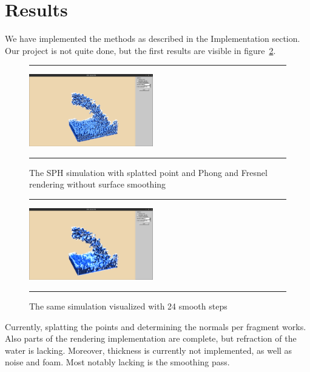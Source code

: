 \section{Results}
We have implemented the methods as described in the Implementation section.
Our project is not quite done, but the first results are visible in figure~\ref{fig:res}.

\begin{figure}[!th]
\hrule
\begin{center}
\vspace*{2ex}\includegraphics[width=0.48\textwidth,clip=true,trim=10cm 1cm 10cm 5cm]{pictures/colors_unsmoothed.png}
\end{center}
\caption{The SPH simulation with splatted point and Phong and Fresnel rendering without surface smoothing}
\label{fig:res} 
\vspace*{2ex}
\hrule
\end{figure}

\begin{figure}[!th]
\hrule
\begin{center}
\vspace*{2ex}\includegraphics[width=0.48\textwidth,clip=true,trim=10cm 1cm 10cm 5cm]{pictures/colors_smoothed.png}
\end{center}
\caption{The same simulation visualized with 24 smooth steps}
\label{fig:res} 
\vspace*{2ex}
\hrule
\end{figure}


Currently, splatting the points and determining the normals per fragment works. Also parts of the rendering implementation are complete, but refraction of the water is lacking.
Moreover, thickness is currently not implemented, as well as noise and foam.
Most notably lacking is the smoothing pass. 

